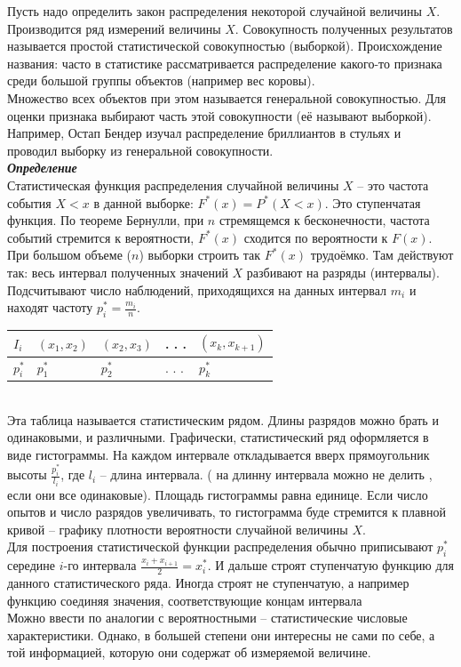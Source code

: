 \documentclass[russian, 12pt, fleqn]{article}
\begin{document}
Пусть надо определить закон распределения некоторой случайной величины $X$. Производится ряд измерений величины $X$. Совокупность полученных результатов называется простой статистической совокупностью (выборкой). Происхождение названия: часто в статистике рассматривается распределение какого-то признака среди большой группы объектов  (например вес коровы).\\ Множество всех объектов при этом
 называется генеральной совокупностью. Для оценки признака выбирают часть этой совокупности (её называют выборкой). Например, Остап Бендер изучал распределение бриллиантов в стульях и проводил выборку из генеральной совокупности.\\
\textit{\textbf{Определение}}\\ 
Статистическая функция распределения случайной величины $X$ -- это частота события $X < x$ в данной выборке: $F^*(x) = P^*(X < x)$.
Это ступенчатая функция. По теореме Бернулли, при $n$ стремящемся к бесконечности, частота событий стремится к вероятности, $F^*(x)$ сходится по вероятности к $F(x)$. При большом объеме ($n$) выборки строить так $F^*(x)$ трудоёмко.  Там действуют так: весь интервал полученных значений $X$ разбивают на разряды (интервалы). Подсчитывают число наблюдений, приходящихся на данных интервал $m_i$  и находят частоту $p_i^* = \frac{m_i}{n}$.\\
\begin{tabular}[b]{ | l | l |  l | l | l |   }
\hline
$ I_i$      & $(x_1, x_2) $ &  $(x_2, x_3) $ & . . . & $(x_k, x_{k + 1})$    \\
\hline
 $p_i^*$ & $p_1^*$       &  $p_2^*$         &  . . . & $p_k^*$\\
\hline
\end{tabular}\\
Эта таблица называется статистическим рядом. Длины разрядов можно брать и одинаковыми, и  различными. 
Графически, статистический ряд оформляется в виде гистограммы. На каждом интервале откладывается вверх прямоугольник высоты $\frac{p_i^*}{l_i}$, где $l_i$ -- длина интервала. ( на длинну интервала можно не делить , если они все одинаковые). Площадь гистограммы равна единице. Если число опытов и число разрядов увеличивать, то гистограмма буде стремится к плавной кривой -- графику плотности  вероятности случайной величины $X$.\\
Для построения статистической функции распределения обычно приписывают $p_i^*$ середине $i$-го интервала $\frac{x_i + x_{i + 1}}{2} = x_i^*$. И дальше строят ступенчатую функцию для данного статистического ряда. Иногда строят не ступенчатую, а например функцию соединяя значения, соответствующие концам интервала\\
Можно ввести по аналогии с вероятностными -- статистические числовые характеристики. Однако, в большей степени они интересны не сами по себе, а той информацией, которую они содержат об измеряемой величине.
\end{document}
